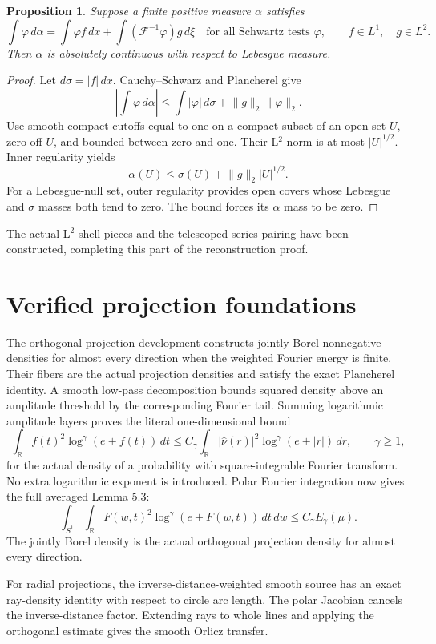 \documentclass[11pt]{article}
\newtheorem{proposition}{Proposition}
\begin{document}
\begin{proposition}
Suppose a finite positive measure $\alpha$ satisfies
\[
\int\varphi\,d\alpha
=\int\varphi f\,dx+\int(\mathcal F^{-1}\varphi)g\,d\xi
\quad\text{for all Schwartz tests }\varphi,
\qquad f\in L^1,\quad g\in L^2.
\]
Then $\alpha$ is absolutely continuous with respect to Lebesgue measure.
\end{proposition}
\begin{proof}
Let $d\sigma=|f|\,dx$. Cauchy--Schwarz and Plancherel give
\[
\left|\int\varphi\,d\alpha\right|
\le\int|\varphi|\,d\sigma+\lVert g\rVert_2\lVert\varphi\rVert_2.
\]
Use smooth compact cutoffs equal to one on a compact subset of an open set
$U$, zero off $U$, and bounded between zero and one. Their L$^2$ norm is at
most $|U|^{1/2}$. Inner regularity yields
\[
\alpha(U)\le\sigma(U)+\lVert g\rVert_2|U|^{1/2}.
\]
For a Lebesgue-null set, outer regularity provides open covers whose
Lebesgue and $\sigma$ masses both tend to zero. The bound forces its
$\alpha$ mass to be zero.
\end{proof}
The actual L$^2$ shell pieces and the telescoped series pairing have been
constructed, completing this part of the reconstruction proof.

\newpage
\section*{Verified projection foundations}
The orthogonal-projection development constructs jointly Borel nonnegative
densities for almost every direction when the weighted Fourier energy is
finite. Their fibers are the actual projection densities and satisfy the
exact Plancherel identity. A smooth low-pass decomposition bounds squared
density above an amplitude threshold by the corresponding Fourier tail.
Summing logarithmic amplitude layers proves the literal one-dimensional bound
\[
\int_{\mathbb R} f(t)^2\log^\gamma(e+f(t))\,dt
\le C_\gamma\int_{\mathbb R}|\widehat\nu(r)|^2
\log^\gamma(e+|r|)\,dr,\qquad\gamma\ge1,
\]
for the actual density of a probability with square-integrable Fourier
transform. No extra logarithmic exponent is introduced. Polar Fourier
integration now gives the full averaged Lemma 5.3:
\[
\int_{S^1}\int_{\mathbb R} F(w,t)^2\log^\gamma(e+F(w,t))\,dt\,dw
\le C_\gamma E_\gamma(\mu).
\]
The jointly Borel density is the actual orthogonal projection density for
almost every direction.

For radial projections, the inverse-distance-weighted smooth source has an
exact ray-density identity with respect to circle arc length. The polar
Jacobian cancels the inverse-distance factor. Extending rays to whole lines
and applying the orthogonal estimate gives the smooth Orlicz transfer.
\end{document}
